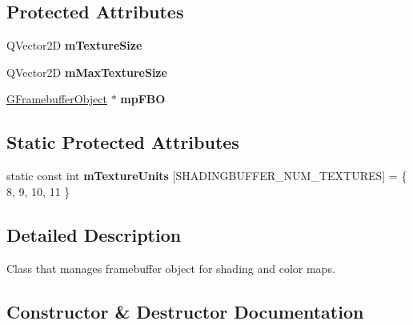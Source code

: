 \subsection*{Protected Attributes}
\begin{DoxyCompactItemize}
\item 
\mbox{\label{class_geometry_engine_1_1_geometry_buffer_1_1_shading_buffer_ab73b4933c8db2bd2c606a51bdfb93710}} 
Q\+Vector2D {\bfseries m\+Texture\+Size}
\item 
\mbox{\label{class_geometry_engine_1_1_geometry_buffer_1_1_shading_buffer_a5343eb21acd29398e8b343f0a9b5a6d8}} 
Q\+Vector2D {\bfseries m\+Max\+Texture\+Size}
\item 
\mbox{\label{class_geometry_engine_1_1_geometry_buffer_1_1_shading_buffer_ac96b8763e3eebd7564a9bc2607df6f89}} 
\mbox{\hyperlink{class_geometry_engine_1_1_geometry_buffer_1_1_g_framebuffer_object}{G\+Framebuffer\+Object}} $\ast$ {\bfseries mp\+F\+BO}
\end{DoxyCompactItemize}
\subsection*{Static Protected Attributes}
\begin{DoxyCompactItemize}
\item 
\mbox{\label{class_geometry_engine_1_1_geometry_buffer_1_1_shading_buffer_abf722158e9b91f9f787c220cc3a3e461}} 
static const int {\bfseries m\+Texture\+Units} \mbox{[}S\+H\+A\+D\+I\+N\+G\+B\+U\+F\+F\+E\+R\+\_\+\+N\+U\+M\+\_\+\+T\+E\+X\+T\+U\+R\+ES\mbox{]} = \{ 8, 9, 10, 11 \}
\end{DoxyCompactItemize}


\subsection{Detailed Description}
Class that manages framebuffer object for shading and color maps. 

\subsection{Constructor \& Destructor Documentation}
\mbox{\label{class_geometry_engine_1_1_geometry_buffer_1_1_shading_buffer_af5039da17d98b71245360dc575b14964}} 

